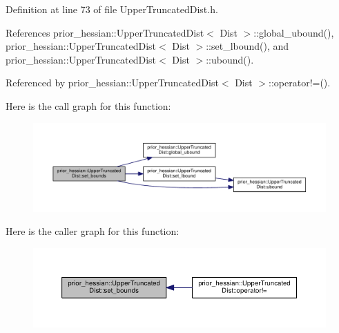 Definition at line 73 of file Upper\+Truncated\+Dist.\+h.



References prior\+\_\+hessian\+::\+Upper\+Truncated\+Dist$<$ Dist $>$\+::global\+\_\+ubound(), prior\+\_\+hessian\+::\+Upper\+Truncated\+Dist$<$ Dist $>$\+::set\+\_\+lbound(), and prior\+\_\+hessian\+::\+Upper\+Truncated\+Dist$<$ Dist $>$\+::ubound().



Referenced by prior\+\_\+hessian\+::\+Upper\+Truncated\+Dist$<$ Dist $>$\+::operator!=().



Here is the call graph for this function\+:\nopagebreak
\begin{figure}[H]
\begin{center}
\leavevmode
\includegraphics[width=350pt]{classprior__hessian_1_1UpperTruncatedDist_a91569d20bfec0bd4b5404e0aef0b89df_cgraph}
\end{center}
\end{figure}




Here is the caller graph for this function\+:\nopagebreak
\begin{figure}[H]
\begin{center}
\leavevmode
\includegraphics[width=350pt]{classprior__hessian_1_1UpperTruncatedDist_a91569d20bfec0bd4b5404e0aef0b89df_icgraph}
\end{center}
\end{figure}



